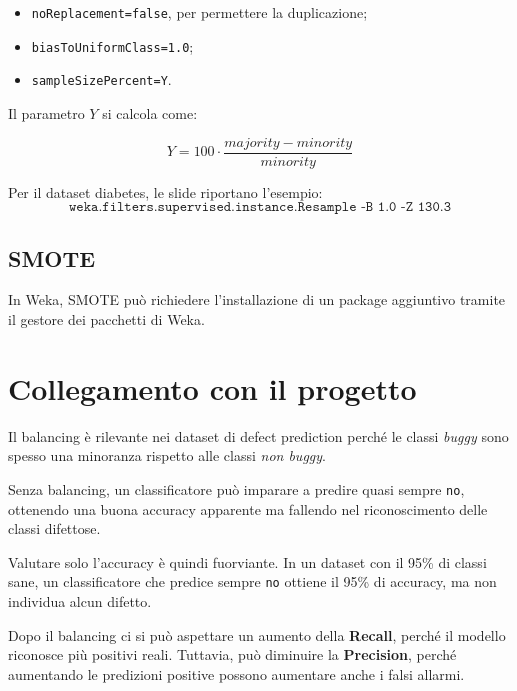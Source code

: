 \begin{itemize}
    \item \texttt{noReplacement=false}, per permettere la duplicazione;
    \item \texttt{biasToUniformClass=1.0};
    \item \texttt{sampleSizePercent=Y}.
\end{itemize}

Il parametro \(Y\) si calcola come:

\[
Y = 100 \cdot \frac{majority - minority}{minority}
\]

\begin{notaslide}
Per il dataset diabetes, le slide riportano l'esempio:
\[
\texttt{weka.filters.supervised.instance.Resample -B 1.0 -Z 130.3}
\]
\end{notaslide}

\subsection{SMOTE}

\begin{notaslide}
In Weka, SMOTE può richiedere l'installazione di un package aggiuntivo tramite il gestore dei pacchetti di Weka.
\end{notaslide}

\section{Collegamento con il progetto}

Il balancing è rilevante nei dataset di defect prediction perché le classi \emph{buggy} sono spesso una minoranza rispetto alle classi \emph{non buggy}.

Senza balancing, un classificatore può imparare a predire quasi sempre \texttt{no}, ottenendo una buona accuracy apparente ma fallendo nel riconoscimento delle classi difettose.

Valutare solo l'accuracy è quindi fuorviante. In un dataset con il 95\% di classi sane, un classificatore che predice sempre \texttt{no} ottiene il 95\% di accuracy, ma non individua alcun difetto.

\begin{notaprof}
Dopo il balancing ci si può aspettare un aumento della \textbf{Recall}, perché il modello riconosce più positivi reali. Tuttavia, può diminuire la \textbf{Precision}, perché aumentando le predizioni positive possono aumentare anche i falsi allarmi.
\end{notaprof}

